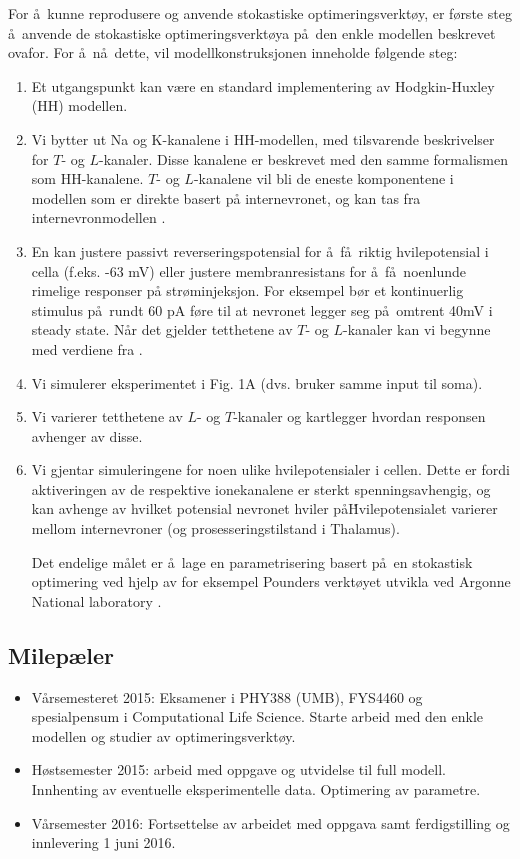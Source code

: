 \documentclass[10pt]{article}
\begin{document}
For \aa\ kunne reprodusere \cite{Halnes2011} og anvende stokastiske optimeringsverkt\o y, er f\o rste steg \aa\ anvende de stokastiske optimeringsverkt\o ya p\aa\ den enkle modellen beskrevet ovafor. 
For \aa\ n\aa\ dette, vil modellkonstruksjonen inneholde f\o lgende steg:
\begin{enumerate}
\item	Et utgangspunkt kan v\ae re en standard implementering av Hodgkin-Huxley (HH) modellen. 
\item	Vi bytter ut Na og K-kanalene i HH-modellen, med tilsvarende beskrivelser for $T$- og $L$-kanaler. Disse kanalene er beskrevet med den samme formalismen som HH-kanalene. $T$- og $L$-kanalene vil bli de eneste komponentene i modellen som er direkte basert på internevronet, og kan tas fra internevronmodellen \cite{Halnes2011}.
\item En kan  
justere passivt reverseringspotensial for \aa\ f\aa\ riktig hvilepotensial i cella (f.eks. -63 mV) eller justere membranresistans for \aa\ f\aa\ noenlunde rimelige responser på str\o minjeksjon. For eksempel b\o r et kontinuerlig stimulus p\aa\ rundt 60 pA f\o re til at nevronet legger seg p\aa\ omtrent 40mV i steady state.
N\aa r det gjelder tetthetene av $T$- og $L$-kanaler kan vi begynne med verdiene fra \cite{Halnes2011}.
\item	Vi simulerer eksperimentet i Fig. 1A (dvs. bruker samme input til soma).
\item	Vi varierer tetthetene av $L$- og $T$-kanaler og kartlegger hvordan responsen avhenger av disse.
\item	Vi gjentar simuleringene for noen ulike hvilepotensialer i cellen. Dette er fordi aktiveringen av de respektive ionekanalene er sterkt spenningsavhengig, og kan avhenge av hvilket potensial nevronet hviler p\aa\. Hvilepotensialet varierer mellom internevroner (og prosesseringstilstand i Thalamus). 

Det endelige m\aa let er \aa\ lage en  parametrisering basert p\aa\ en stokastisk optimering ved hjelp av for eksempel Pounders verkt\o yet utvikla ved Argonne National laboratory \cite{pounders}. 
\end{enumerate}

\subsection*{Milep\ae ler}

\begin{itemize}
\item V\aa rsemesteret 2015:  Eksamener i PHY388 (UMB), FYS4460 og spesialpensum i Computational Life Science.
Starte arbeid med den enkle modellen og studier av optimeringsverkt\o y.
\item H\o stsemester 2015: arbeid med oppgave og utvidelse til full modell. Innhenting av eventuelle eksperimentelle data. Optimering av parametre.
\item V\aa rsemester 2016: Fortsettelse av arbeidet med oppgava samt ferdigstilling og innlevering 1 juni 2016.
\end{itemize}
\end{document}
